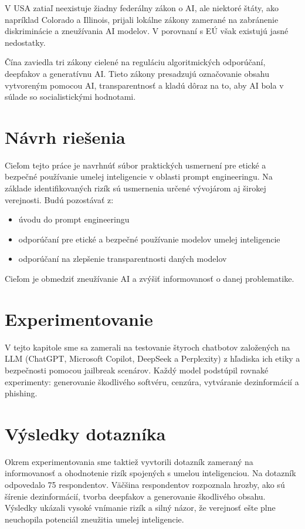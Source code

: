 V USA zatiaľ neexistuje žiadny federálny zákon o AI, ale niektoré štáty, ako napríklad Colorado a Illinois, prijali lokálne zákony zamerané na zabránenie diskriminácie a zneužívania AI modelov. V porovnaní s EÚ však existujú jasné nedostatky.

Čína zaviedla tri zákony cielené na reguláciu algoritmických odporúčaní, deepfakov a generatívnu AI. Tieto zákony presadzujú označovanie obsahu vytvoreným pomocou AI, transparentnosť a kladú dôraz na to, aby AI bola v súlade so socialistickými hodnotami.

\section*{Návrh riešenia \label{sec:solution_proposal_resume}}

Cieľom tejto práce je navrhnúť súbor praktických usmernení pre etické a bezpečné používanie umelej inteligencie v oblasti prompt engineeringu. Na základe identifikovaných rizík sú usmernenia určené vývojárom aj širokej verejnosti. Budú pozostávať z: 

\begin{itemize}
    \item úvodu do prompt engineeringu
    \item odporúčaní pre etické a bezpečné používanie modelov umelej inteligencie
    \item odporúčaní na zlepšenie transparentnosti daných modelov
\end{itemize}

Cieľom je obmedziť zneužívanie AI a zvýšiť informovanosť o danej problematike.

\section*{Experimentovanie \label{sec:experimenting_resume}}

V tejto kapitole sme sa zamerali na testovanie štyroch chatbotov založených na LLM (ChatGPT, Microsoft Copilot, DeepSeek a Perplexity) z hľadiska ich etiky a bezpečnosti pomocou jailbreak scenárov. Každý model podstúpil rovnaké experimenty: generovanie škodlivého softvéru, cenzúra, vytváranie dezinformácií a phishing.

\section*{Výsledky dotazníka \label{sec:survey_resume}}

Okrem experimentovania sme taktiež vyvtorili dotazník zameraný na informovanosť a ohodnotenie rizík spojených s umelou inteligenciou. Na dotazník odpovedalo 75 respondentov. Väčšina respondentov rozpoznala hrozby, ako sú šírenie dezinformácií, tvorba deepfakov a generovanie škodlivého obsahu. Výsledky ukázali vysoké vnímanie rizík a silný názor, že verejnosť ešte plne neuchopila potenciál zneužitia umelej inteligencie.

